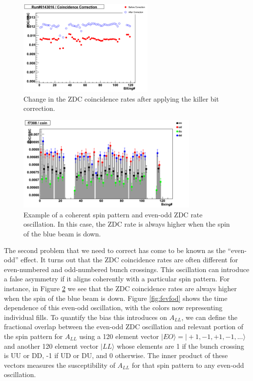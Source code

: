 \begin{figure}
  \begin{center}
    \includegraphics[width=0.6\textwidth]{figures/coinRat6143016}
  \end{center}
  \caption{Change in the ZDC coincidence rates after applying the killer bit
  correction.}
  \label{fig:coinRat6143016}
\end{figure}

\begin{figure}
  \begin{center}
    \includegraphics[width=0.8\textwidth]{figures/c7308}
  \end{center}
  \caption{Example of a coherent spin pattern and even-odd ZDC rate
  oscillation. In this case, the ZDC rate is always higher when the spin of
  the blue beam is down.}
  \label{fig:c7308}
\end{figure}

The second problem that we need to correct has come to be known as the
``even-odd'' effect. It turns out that the ZDC coincidence rates are often
different for even-numbered and odd-numbered bunch crossings. This oscillation
can introduce a false asymmetry if it aligns coherently with a particular spin
pattern. For instance, in Figure \ref{fig:c7308} we see that the ZDC
coincidence rates are always higher when the spin of the blue beam is down.
Figure \ref{fig:fevfod} shows the time dependence of this even-odd
oscillation, with the colors now representing individual fills. To quantify
the bias this introduces on $A_{LL}$, we can define the fractional overlap
between the even-odd ZDC oscillation and relevant portion of the spin pattern
for $A_{LL}$ using a 120 element vector $|EO\rangle = |+1,-1,+1,-1,...\rangle$
and another 120 element vector $|LL\rangle$ whose elements are 1 if the bunch
crossing is UU or DD, -1 if UD or DU, and 0 otherwise. The inner product of
these vectors measures the susceptibility of $A_{LL}$ for that spin pattern to
any even-odd oscillation.

